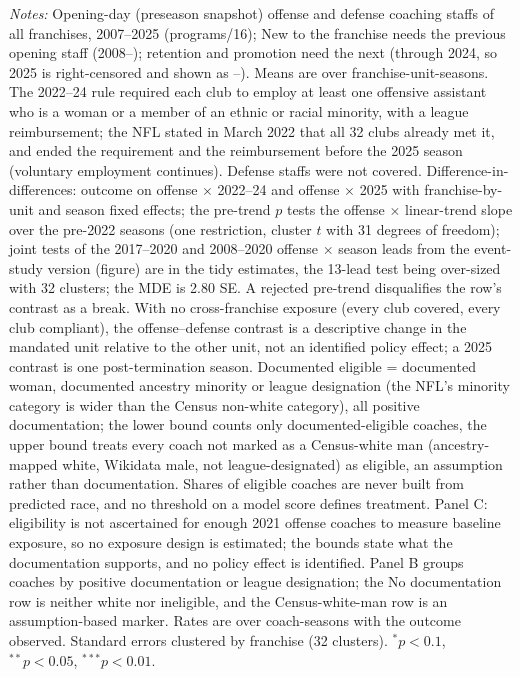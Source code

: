\begin{table}[H]
\begin{minipage}{\textwidth}
\textit{Notes:} Opening-day (preseason snapshot) offense and defense coaching staffs of all franchises, 2007--2025 (programs/16); New to the franchise needs the previous opening staff (2008--); retention and promotion need the next (through 2024, so 2025 is right-censored and shown as --). Means are over franchise-unit-seasons. The 2022--24 rule required each club to employ at least one offensive assistant who is a woman or a member of an ethnic or racial minority, with a league reimbursement; the NFL stated in March 2022 that all 32 clubs already met it, and ended the requirement and the reimbursement before the 2025 season (voluntary employment continues). Defense staffs were not covered. Difference-in-differences: outcome on offense $\times$ 2022--24 and offense $\times$ 2025 with franchise-by-unit and season fixed effects; the pre-trend $p$ tests the offense $\times$ linear-trend slope over the pre-2022 seasons (one restriction, cluster $t$ with 31 degrees of freedom); joint tests of the 2017--2020 and 2008--2020 offense $\times$ season leads from the event-study version (figure) are in the tidy estimates, the 13-lead test being over-sized with 32 clusters; the MDE is 2.80 SE. A rejected pre-trend disqualifies the row's contrast as a break. With no cross-franchise exposure (every club covered, every club compliant), the offense--defense contrast is a descriptive change in the mandated unit relative to the other unit, not an identified policy effect; a 2025 contrast is one post-termination season. Documented eligible = documented woman, documented ancestry minority or league designation (the NFL's minority category is wider than the Census non-white category), all positive documentation; the lower bound counts only documented-eligible coaches, the upper bound treats every coach not marked as a Census-white man (ancestry-mapped white, Wikidata male, not league-designated) as eligible, an assumption rather than documentation. Shares of eligible coaches are never built from predicted race, and no threshold on a model score defines treatment. Panel C: eligibility is not ascertained for enough 2021 offense coaches to measure baseline exposure, so no exposure design is estimated; the bounds state what the documentation supports, and no policy effect is identified. Panel B groups coaches by positive documentation or league designation; the No documentation row is neither white nor ineligible, and the Census-white-man row is an assumption-based marker. Rates are over coach-seasons with the outcome observed. Standard errors clustered by franchise (32 clusters). $^{*}p<0.1$, $^{**}p<0.05$, $^{***}p<0.01$.
\end{minipage}
\end{table}
